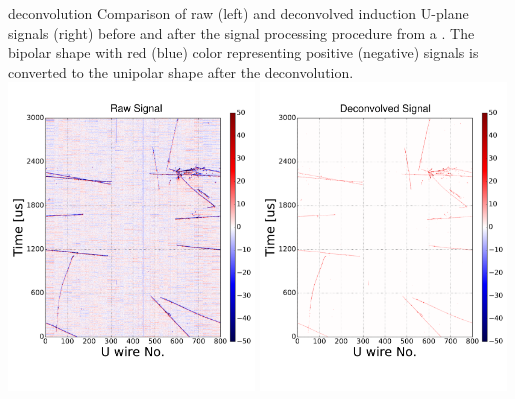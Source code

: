 \documentclass[../main-v1.tex]{subfiles}
\begin{document}
\begin{dunefigure}
{deconvolution} %
{Comparison of raw (left) and deconvolved induction U-plane signals (right) before and after 
the signal processing procedure from a  . The bipolar shape with red (blue) color representing
positive (negative) signals is converted to the unipolar shape after the \twod deconvolution.}
\includegraphics[width=0.49\textwidth]{graphics/IntroFigures/Fig_05a_protodune_raw_u.pdf}
\includegraphics[width=0.49\textwidth]{graphics/IntroFigures/Fig_05b_protodune_decon_u.pdf}
\end{dunefigure}
\end{document}
